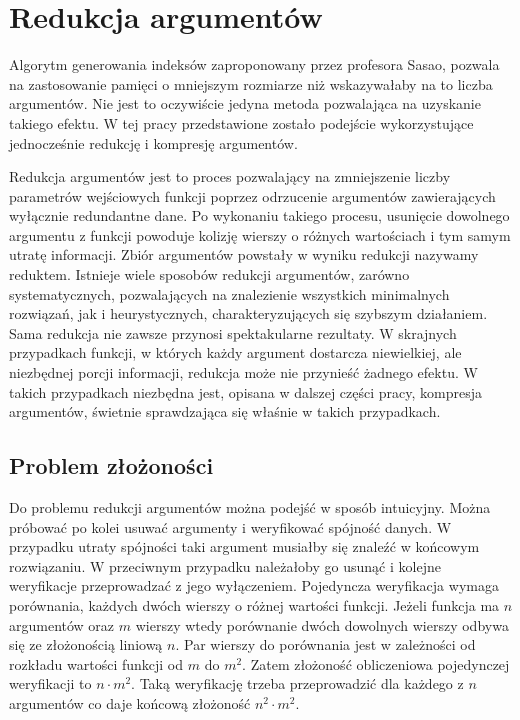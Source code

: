 \chapter{Redukcja argumentów}

Algorytm generowania indeksów zaproponowany przez profesora Sasao,
pozwala na zastosowanie pamięci o mniejszym rozmiarze niż wskazywałaby na to liczba argumentów.
Nie jest to oczywiście jedyna metoda pozwalająca na  uzyskanie takiego efektu.
W tej pracy przedstawione zostało podejście wykorzystujące jednocześnie redukcję i kompresję argumentów.

Redukcja argumentów jest to proces pozwalający na zmniejszenie liczby parametrów wejściowych funkcji poprzez odrzucenie argumentów zawierających wyłącznie redundantne dane.
Po wykonaniu takiego procesu,
usunięcie dowolnego argumentu z funkcji powoduje kolizję wierszy o różnych wartościach i tym samym utratę informacji.
Zbiór argumentów powstały w wyniku redukcji nazywamy reduktem.
Istnieje wiele sposobów redukcji argumentów,
zarówno systematycznych,
pozwalających na znalezienie wszystkich minimalnych rozwiązań,
jak i heurystycznych,
charakteryzujących się szybszym działaniem.
Sama redukcja nie zawsze przynosi spektakularne rezultaty.
W skrajnych przypadkach funkcji,
w których każdy argument dostarcza niewielkiej,
ale niezbędnej porcji informacji,
redukcja może nie przynieść żadnego efektu.
W takich przypadkach niezbędna jest,
opisana w dalszej części pracy,
kompresja argumentów,
świetnie sprawdzająca się właśnie w takich przypadkach.

\section{Problem złożoności}

Do problemu redukcji argumentów można podejść w sposób intuicyjny.
Można próbować po kolei usuwać argumenty i weryfikować spójność danych.
W przypadku utraty spójności taki argument musiałby się znaleźć w końcowym rozwiązaniu.
W przeciwnym przypadku należałoby go usunąć i kolejne weryfikacje przeprowadzać z jego wyłączeniem.
Pojedyncza weryfikacja wymaga porównania,
każdych dwóch wierszy o różnej wartości funkcji.
Jeżeli funkcja ma $n$ argumentów oraz $m$ wierszy wtedy porównanie dwóch dowolnych wierszy odbywa się ze złożonością liniową $n$.
Par wierszy do porównania jest w zależności od rozkładu wartości funkcji od $m$ do $m^2$.
Zatem złożoność obliczeniowa pojedynczej weryfikacji to $n \cdot m^2$.
Taką weryfikację trzeba przeprowadzić dla każdego z $n$ argumentów co daje końcową złożoność $n^2 \cdot m^2$.


